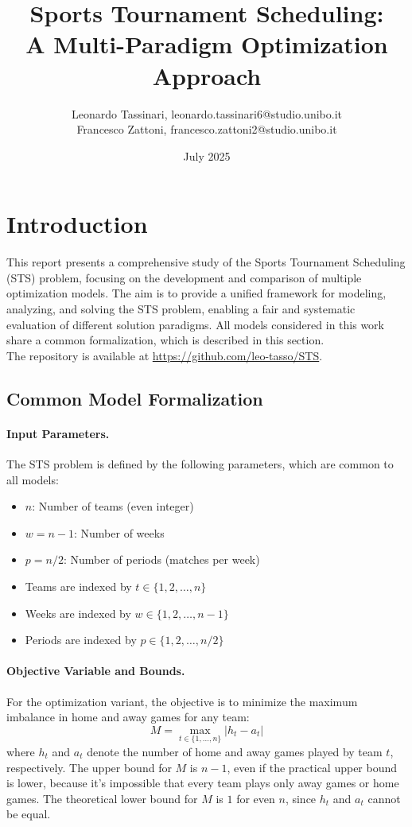 \documentclass[11pt]{article}
\title{\textbf{Sports Tournament Scheduling: \\
A Multi-Paradigm Optimization Approach}}
\author{
Leonardo Tassinari, leonardo.tassinari6@studio.unibo.it
\\
Francesco Zattoni, francesco.zattoni2@studio.unibo.it
\\ 
}
\date{July 2025}
\begin{document}
\maketitle

\section{Introduction}
This report presents a comprehensive study of the Sports Tournament Scheduling (STS) problem, focusing on the development and comparison of multiple optimization models. The aim is to provide a unified framework for modeling, analyzing, and solving the STS problem, enabling a fair and systematic evaluation of different solution paradigms. All models considered in this work share a common formalization, which is described in this section.\\
The repository is available at \url{https://github.com/leo-tasso/STS}.

\subsection{Common Model Formalization}

\paragraph{Input Parameters.}
The STS problem is defined by the following parameters, which are common to all models:
\begin{itemize}
    \item $n$: Number of teams (even integer)
    \item $w = n-1$: Number of weeks
    \item $p = n/2$: Number of periods (matches per week)
    \item Teams are indexed by $t \in \{1, 2, \ldots, n\}$
    \item Weeks are indexed by $w \in \{1, 2, \ldots, n-1\}$
    \item Periods are indexed by $p \in \{1, 2, \ldots, n/2\}$
\end{itemize}

\paragraph{Objective Variable and Bounds.}
For the optimization variant, the objective is to minimize the maximum imbalance in home and away games for any team:
\[
M = \max_{t \in \{1, \ldots, n\}} |h_t - a_t|
\]
where $h_t$ and $a_t$ denote the number of home and away games played by team $t$, respectively. The upper bound for $M$ is $n-1$, even if the practical upper bound is lower, because it's impossible that every team plays only away games or home games. The theoretical lower bound for $M$ is $1$ for even $n$, since $h_t$ and $a_t$ cannot be equal.
\end{document}
